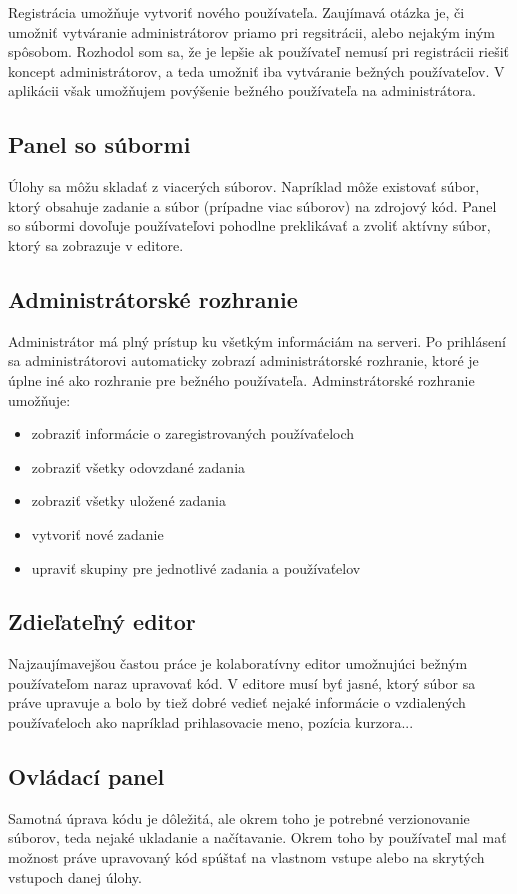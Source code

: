 Registrácia umožňuje vytvoriť nového používateľa. Zaujímavá otázka je, či umožniť vytváranie
administrátorov priamo pri regsitrácii, alebo nejakým iným spôsobom. Rozhodol som sa, že je lepšie
ak používateľ nemusí pri registrácii riešiť koncept administrátorov, a teda umožniť iba vytváranie
bežných používateľov. V aplikácii však umožňujem povýšenie bežného používateľa na administrátora.

\subsection{Panel so súbormi}
Úlohy sa môžu skladať z viacerých súborov. Napríklad môže existovať súbor, ktorý
obsahuje zadanie a súbor (prípadne viac súborov) na zdrojový kód. Panel so súbormi dovoľuje
používateľovi pohodlne preklikávať a zvoliť aktívny súbor, ktorý sa zobrazuje v editore.

\subsection{Administrátorské rozhranie}
Administrátor má plný prístup ku všetkým informáciám na serveri. Po prihlásení sa administrátorovi
automaticky zobrazí administrátorské rozhranie, ktoré je úplne iné ako rozhranie pre bežného
používateľa. Adminstrátorské rozhranie umožňuje:
\begin{itemize}
\item zobraziť informácie o zaregistrovaných používaťeloch
\item zobraziť všetky odovzdané zadania
\item zobraziť všetky uložené zadania
\item vytvoriť nové zadanie
\item upraviť skupiny pre jednotlivé zadania a používaťelov
\end{itemize}

\subsection{Zdieľateľný editor}
Najzaujímavejšou častou práce je kolaboratívny editor umožnujúci bežným používateľom naraz
upravovať kód. V editore musí byť jasné, ktorý súbor sa práve upravuje a bolo by
tiež dobré vedieť nejaké informácie o vzdialených používaťeloch ako napríklad prihlasovacie meno, 
pozícia kurzora...

\subsection{Ovládací panel}
Samotná úprava kódu je dôležitá, ale okrem toho je potrebné verzionovanie
súborov, teda nejaké ukladanie a načítavanie. Okrem toho by používateľ mal mať možnost práve
upravovaný kód spúštať na vlastnom vstupe alebo na skrytých vstupoch danej úlohy.


